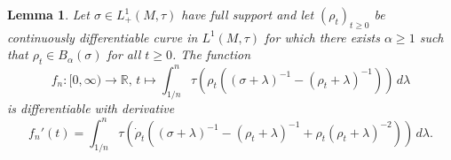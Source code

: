 \documentclass[12pt,a4paper]{amsart}
\newcommand{\1}{\mathds{1}}
\newcommand{\IR}{\mathbb R}
\theoremstyle{plain}
\newtheorem{lemma}[proposition]{Lemma}
\theoremstyle{definition}
\theoremstyle{remark}
\begin{document}
\begin{lemma}\label{lem:deriv_approx_entropy}
Let $\sigma\in L^1_+(M,\tau)$ have full support and let $(\rho_t)_{t\geq 0}$ be continuously differentiable curve in $L^1(M,\tau)$ for which there exists $\alpha\geq 1$ such that $\rho_t\in B_\alpha(\sigma)$ for all $t\geq 0$. The function
\begin{equation*}
f_n\colon [0,\infty)\to \IR,\,t\mapsto\int_{1/n}^n \tau(\rho_t((\sigma+\lambda)^{-1}-(\rho_t+\lambda)^{-1}))\,d\lambda
\end{equation*}
is differentiable with derivative
\begin{equation*}
f_n'(t)=\int_{1/n}^n \tau(\dot\rho_t((\sigma+\lambda)^{-1}-(\rho_t+\lambda)^{-1}+\rho_t(\rho_t+\lambda)^{-2}))\,d\lambda.
\end{equation*}
\end{lemma}
\end{document}
